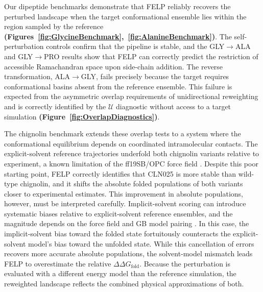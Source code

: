 \documentclass[journal=jctcce,manuscript=article,layout=twocolumn,hyperref=true]{achemso}
\newcommand{\figrefp}[2][]{\textbf{(Figure~\ref{#2}#1)}}
\newcommand{\figsrefcp}[2]{\textbf{(Figures~\ref{#1},~\ref{#2})}}
\begin{document}
	Our dipeptide benchmarks demonstrate that FELP reliably recovers the perturbed landscape when the target conformational ensemble lies within the region sampled by the reference \figsrefcp{fig:GlycineBenchmark}{fig:AlanineBenchmark}. The self-perturbation controls confirm that the pipeline is stable, and the GLY$\rightarrow$ALA and GLY$\rightarrow$PRO results show that FELP can correctly predict the restriction of accessible Ramachandran space upon side-chain addition. The reverse transformation, ALA$\rightarrow$GLY, fails precisely because the target requires conformational basins absent from the reference ensemble. This failure is expected from the asymmetric overlap requirements of unidirectional reweighting and is correctly identified by the $\mathcal{U}$ diagnostic without access to a target simulation \figrefp{fig:OverlapDiagnostics}.
	
	The chignolin benchmark extends these overlap tests to a system where the conformational equilibrium depends on coordinated intramolecular contacts. The explicit-solvent reference trajectories underfold both chignolin variants relative to experiment, a known limitation of the ff19SB/OPC force field \cite{fischer2024jctc}. Despite this poor starting point, FELP correctly identifies that CLN025 is more stable than wild-type chignolin, and it shifts the absolute folded populations of both variants closer to experimental estimates. This improvement in absolute populations, however, must be interpreted carefully. Implicit-solvent scoring can introduce systematic biases relative to explicit-solvent reference ensembles, and the magnitude depends on the force field and GB model pairing \cite{nguyen2013gbneck2}. In this case, the implicit-solvent bias toward the folded state fortuitously counteracts the explicit-solvent model's bias toward the unfolded state. While this cancellation of errors recovers more accurate absolute populations, the solvent-model mismatch leads FELP to overestimate the relative $\Delta\Delta G_{\mathrm{fold}}$. Because the perturbation is evaluated with a different energy model than the reference simulation, the reweighted landscape reflects the combined physical approximations of both.
	
\end{document}
